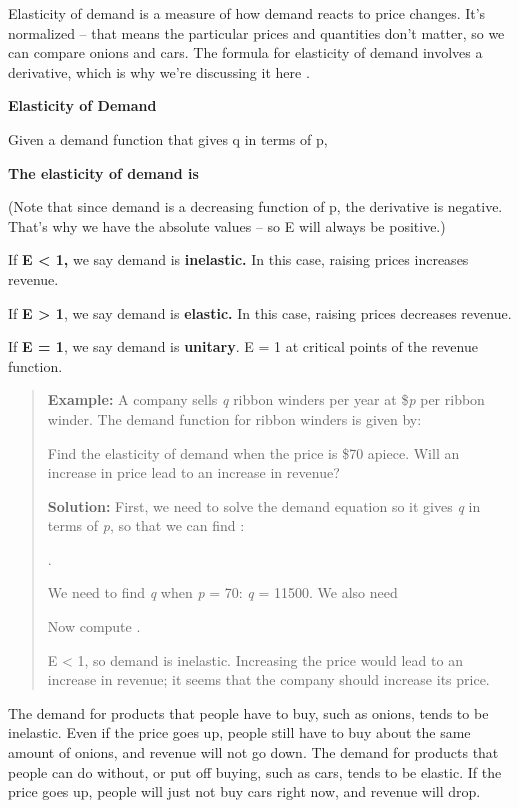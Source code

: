 Elasticity of demand is a measure of how demand reacts to price changes.
It's normalized -- that means the particular prices and quantities don't
matter, so we can compare onions and cars. The formula for elasticity of
demand involves a derivative, which is why we're discussing it here .

\textbf{Elasticity of Demand}

Given a demand function that gives q in terms of p,

\textbf{The elasticity of demand is }

(Note that since demand is a decreasing function of p, the derivative is
negative. That's why we have the absolute values -- so E will always be
positive.)

If \textbf{E \textless{} 1,} we say demand is \textbf{inelastic.} In
this case, raising prices increases revenue.

If \textbf{E \textgreater{} 1}, we say demand is \textbf{elastic.} In
this case, raising prices decreases revenue.

If \textbf{E = 1}, we say demand is \textbf{unitary}. E = 1 at critical
points of the revenue function.

\begin{quote}
\textbf{Example:} A company sells \emph{q} ribbon winders per year at
\$\emph{p} per ribbon winder. The demand function for ribbon winders is
given by:

Find the elasticity of demand when the price is \$70 apiece. Will an
increase in price lead to an increase in revenue?

\textbf{Solution:} First, we need to solve the demand equation so it
gives \emph{q} in terms of \emph{p}, so that we can find :

.

We need to find \emph{q} when \emph{p} = 70: \emph{q} = 11500. We also
need

Now compute .

E \textless{} 1, so demand is inelastic. Increasing the price would lead
to an increase in revenue; it seems that the company should increase its
price.
\end{quote}

The demand for products that people have to buy, such as onions, tends
to be inelastic. Even if the price goes up, people still have to buy
about the same amount of onions, and revenue will not go down. The
demand for products that people can do without, or put off buying, such
as cars, tends to be elastic. If the price goes up, people will just not
buy cars right now, and revenue will drop.

